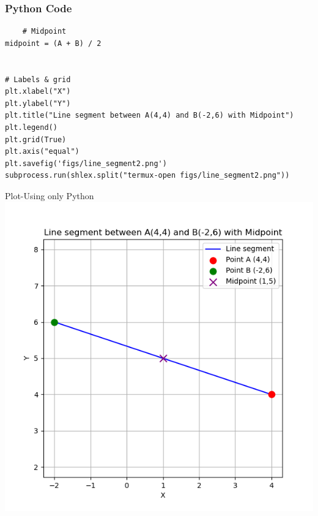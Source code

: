 \documentclass{beamer}
\begin{document}
\begin{frame}[fragile]
    \frametitle{Python Code }
    \begin{lstlisting}
    # Midpoint
midpoint = (A + B) / 2


# Labels & grid
plt.xlabel("X")
plt.ylabel("Y")
plt.title("Line segment between A(4,4) and B(-2,6) with Midpoint")
plt.legend()
plt.grid(True)
plt.axis("equal")
plt.savefig('figs/line_segment2.png')
subprocess.run(shlex.split("termux-open figs/line_segment2.png"))

\end{lstlisting}
\end{frame}




\begin{frame}{Plot-Using only Python}
    \centering
    \includegraphics[width=\columnwidth, height=0.8\textheight, keepaspectratio]{figs/line_segment2.png}     
\end{frame}
\end{document}

